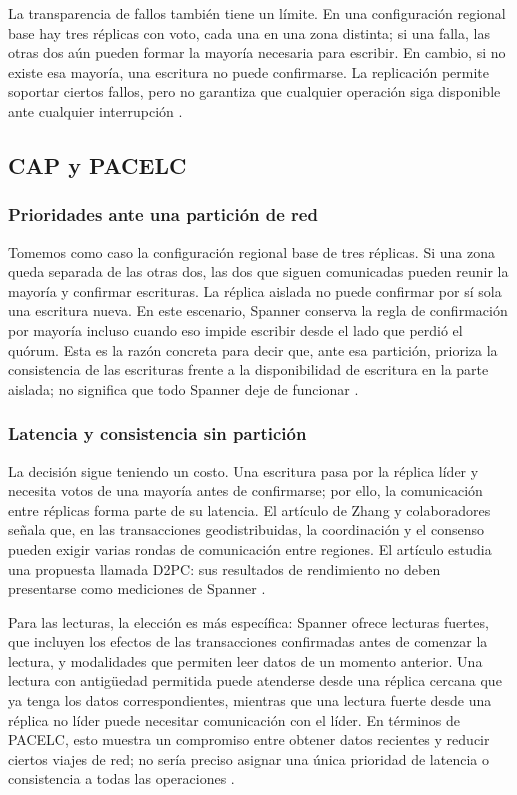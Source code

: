 \documentclass[11pt,a4paper]{article}
\begin{document}
La transparencia de fallos también tiene un límite. En una configuración regional base hay tres réplicas con voto, cada una en una zona distinta; si una falla, las otras dos aún pueden formar la mayoría necesaria para escribir. En cambio, si no existe esa mayoría, una escritura no puede confirmarse. La replicación permite soportar ciertos fallos, pero no garantiza que cualquier operación siga disponible ante cualquier interrupción \cite{GoogleSpannerReplication}.

\subsection{CAP y PACELC}
\subsubsection{Prioridades ante una partición de red}
Tomemos como caso la configuración regional base de tres réplicas. Si una zona queda separada de las otras dos, las dos que siguen comunicadas pueden reunir la mayoría y confirmar escrituras. La réplica aislada no puede confirmar por sí sola una escritura nueva. En este escenario, Spanner conserva la regla de confirmación por mayoría incluso cuando eso impide escribir desde el lado que perdió el quórum. Esta es la razón concreta para decir que, ante esa partición, prioriza la consistencia de las escrituras frente a la disponibilidad de escritura en la parte aislada; no significa que todo Spanner deje de funcionar \cite{GoogleSpannerReplication}.

\subsubsection{Latencia y consistencia sin partición}
La decisión sigue teniendo un costo. Una escritura pasa por la réplica líder y necesita votos de una mayoría antes de confirmarse; por ello, la comunicación entre réplicas forma parte de su latencia. El artículo de Zhang y colaboradores señala que, en las transacciones geodistribuidas, la coordinación y el consenso pueden exigir varias rondas de comunicación entre regiones. El artículo estudia una propuesta llamada D2PC: sus resultados de rendimiento no deben presentarse como mediciones de Spanner \cite{GoogleSpannerReplication,ZhangEtAl2024D2PC}.

Para las lecturas, la elección es más específica: Spanner ofrece lecturas fuertes, que incluyen los efectos de las transacciones confirmadas antes de comenzar la lectura, y modalidades que permiten leer datos de un momento anterior. Una lectura con antigüedad permitida puede atenderse desde una réplica cercana que ya tenga los datos correspondientes, mientras que una lectura fuerte desde una réplica no líder puede necesitar comunicación con el líder. En términos de PACELC, esto muestra un compromiso entre obtener datos recientes y reducir ciertos viajes de red; no sería preciso asignar una única prioridad de latencia o consistencia a todas las operaciones \cite{GoogleSpannerTransactions,GoogleSpannerReplication}.
\end{document}
